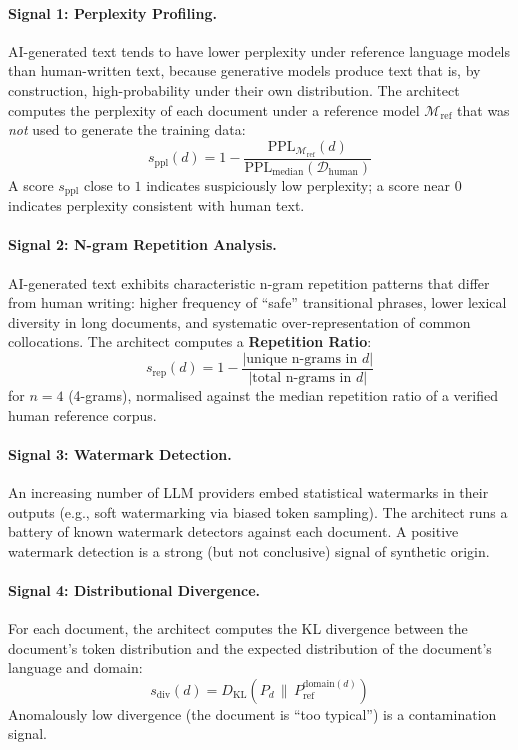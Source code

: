 \paragraph{Signal 1: Perplexity Profiling.}
AI-generated text tends to have lower perplexity under
reference language models than human-written text, because
generative models produce text that is, by construction,
high-probability under their own distribution.
The architect computes the perplexity of each document under
a reference model $\mathcal{M}_{\mathrm{ref}}$ that was
\emph{not} used to generate the training data:
\begin{equation}
  \label{eq:perplexity-score}
  s_{\mathrm{ppl}}(d)
    = 1 - \frac{
        \mathrm{PPL}_{\mathcal{M}_{\mathrm{ref}}}(d)
      }{
        \mathrm{PPL}_{\mathrm{median}}(\mathcal{D}_{\mathrm{human}})
      }
\end{equation}
A score $s_{\mathrm{ppl}}$ close to $1$ indicates
suspiciously low perplexity; a score near $0$ indicates
perplexity consistent with human text.

\paragraph{Signal 2: N-gram Repetition Analysis.}
AI-generated text exhibits characteristic n-gram repetition
patterns that differ from human writing: higher frequency of
``safe'' transitional phrases, lower lexical diversity in
long documents, and systematic over-representation of common
collocations.
The architect computes a \textbf{Repetition Ratio}:
\begin{equation}
  \label{eq:repetition-score}
  s_{\mathrm{rep}}(d)
    = 1 - \frac{|\text{unique n-grams in } d|}{|\text{total n-grams in } d|}
\end{equation}
for $n = 4$ (4-grams), normalised against the median
repetition ratio of a verified human reference corpus.

\paragraph{Signal 3: Watermark Detection.}
An increasing number of LLM providers embed statistical
watermarks in their outputs (e.g., soft watermarking via
biased token sampling).
The architect runs a battery of known watermark detectors
against each document.
A positive watermark detection is a strong (but not
conclusive) signal of synthetic origin.

\paragraph{Signal 4: Distributional Divergence.}
For each document, the architect computes the KL divergence
between the document's token distribution and the expected
distribution of the document's language and domain:
\begin{equation}
  \label{eq:divergence-score}
  s_{\mathrm{div}}(d)
    = D_{\mathrm{KL}}\!\left(
        P_d \,\|\, P_{\mathrm{ref}}^{\mathrm{domain}(d)}
      \right)
\end{equation}
Anomalously low divergence (the document is ``too typical'')
is a contamination signal.

